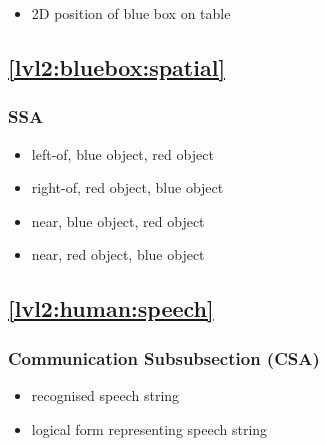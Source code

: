 \documentclass{article}
\begin{document}
\begin{itemize}

\item 2D position of blue box on table 

\end{itemize}


\subsection{\ref{lvl2:bluebox:spatial}}

\subsubsection{SSA}

\begin{itemize}

\item left-of, blue object, red object

\item right-of, red object, blue object

\item near, blue object, red object

\item near, red object, blue object

\end{itemize}
 

\subsection{\ref{lvl2:human:speech}}

\subsubsection{Communication Subsubsection (CSA)}

\begin{itemize}

\item recognised speech string

\item logical form representing speech string

\end{itemize}



\end{document}
